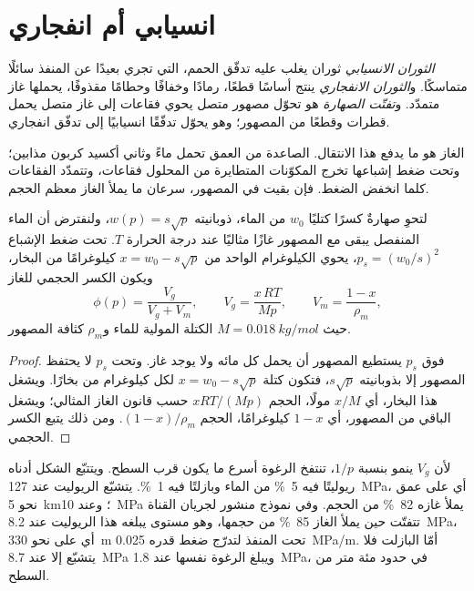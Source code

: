 \section{انسيابي أم انفجاري}

\begin{definition}\label{def:b2:eruptive-styles:regimes}
\emph{الثوران الانسيابي} ثوران يغلب عليه
تدفّق الحمم، التي تجري بعيدًا عن المنفذ سائلًا متماسكًا.
و\emph{الثوران الانفجاري} ينتج أساسًا قطعًا،
رمادًا وخفافًا وحطامًا مقذوفًا، يحملها غاز متمدّد. و\emph{تفتّت
الصهارة} هو تحوّل مصهور متصل
يحوي فقاعات إلى غاز متصل يحمل قطرات وقطعًا من المصهور؛
وهو يحوّل تدفّقًا انسيابيًا إلى تدفّق انفجاري.
\end{definition}

الغاز هو ما يدفع هذا الانتقال.  الصاعدة من العمق تحمل
ماءً وثاني أكسيد كربون مذابين؛ وتحت ضغط إشباعها تخرج المكوّنات المتطايرة
من المحلول فقاعات، وتتمدّد الفقاعات كلما انخفض الضغط.
فإن بقيت في المصهور، سرعان ما يملأ الغاز معظم الحجم.

\begin{proposition}\label{prop:b2:eruptive-styles:gas}
لتحوِ صهارةٌ كسرًا كتليًا $w_0$ من الماء، ذوبانيته $w(p) =
s\sqrt p$، ولنفترض أن الماء المنفصل يبقى مع المصهور غازًا مثاليًا
عند درجة الحرارة $T$. تحت ضغط الإشباع $p_s = (w_0/s)^2$، يحوي الكيلوغرام
الواحد من  $x = w_0 - s\sqrt p$ كيلوغرامًا من البخار، ويكون الكسر
الحجمي للغاز
\[
\phi(p) = \frac{V_g}{V_g + V_m}, \qquad V_g = \frac{x\,RT}{M p}, \qquad
V_m = \frac{1 - x}{\rho_m},
\]
حيث $M = \qty{0.018}{kg/mol}$ الكتلة المولية للماء و$\rho_m$ كثافة
المصهور.
\end{proposition}

\begin{proof}
فوق $p_s$ يستطيع المصهور أن يحمل كل مائه ولا يوجد غاز. وتحت $p_s$
لا يحتفظ المصهور إلا بذوبانيته $s\sqrt p$، فتكون كتلة $x = w_0 - s\sqrt p$ لكل
كيلوغرام من  بخارًا. ويشغل هذا البخار، أي $x/M$ مولًا، الحجم $xRT/(Mp)$ حسب
قانون الغاز المثالي؛ ويشغل الباقي من المصهور، أي $1 - x$ كيلوغرامًا، الحجم $(1 - x)/\rho_m$.
ومن ذلك يتبع الكسر الحجمي.
\end{proof}

لأن $V_g$ ينمو بنسبة $1/p$، تنتفخ الرغوة أسرع ما يكون قرب السطح.
ويتتبّع الشكل أدناه ريوليتًا فيه \qty{5}{\percent} من الماء وبازلتًا
فيه \qty{1}{\percent}. يتشبّع الريوليت عند \qty{127}{MPa}، أي على عمق نحو
\qty{5}{km}؛ وعند \qty{10}{MPa} يملأ غازه \qty{82}{\percent} من
الحجم. وفي نموذج منشور لجريان القناة تتفتّت  حين يملأ
الغاز \qty{85}{\percent} من حجمها، وهو مستوى يبلغه هذا الريوليت عند
\qty{8.2}{MPa}، أي على نحو \qty{330}{m} تحت المنفذ لتدرّج ضغط قدره
\qty{0.025}{MPa/m}. أمّا البازلت فلا يتشبّع إلا عند \qty{8.7}{MPa} ويبلغ
الرغوة نفسها عند \qty{1.8}{MPa}، في حدود مئة متر من السطح.

